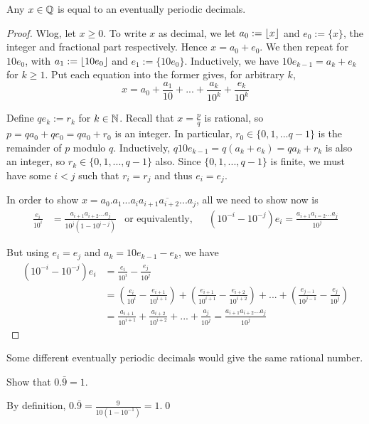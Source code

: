 \documentclass[11pt]{article}
\begin{document}
\begin{theorem}
  Any \(x \in \mathbb{Q}\) is equal to an eventually periodic decimals.
\end{theorem}
\begin{proof}
  Wlog, let \(x\geq 0\). To write \(x\) as decimal, we let \(a_0:=\left \lfloor x \right \rfloor\) and \(e_0:=\{x\}\), the integer and fractional part respectively. Hence \(x=a_0+e_0\).
  We then repeat for \(10e_0\), with \(a_1:=\left \lfloor 10e_0 \right \rfloor\) and \(e_1:=\{10e_0\}\).
  Inductively, we have \(10e_{k-1}=a_k+e_k\) for \(k\geq 1\).
  Put each equation into the former gives, for arbitrary \(k\), 
  \[x=a_0+\frac{a_1}{10}+...+\frac{a_k}{10^k}+\frac{e_k}{10^k}\]
  
  Define \(qe_k:=r_k\) for \(k\in\mathbb{N}\). Recall that \(x=\frac{p}{q}\) is rational, so \(p=qa_0+qe_0=qa_0+r_0\) is an integer. In particular, \(r_0 \in \{0,1,...q-1\}\) is the remainder of \(p\) modulo \(q\). Inductively, \(q10e_{k-1}=q(a_k+e_k)=qa_k+r_k\) is also an integer, so \(r_k \in \{0,1,...,q-1\}\) also. Since \(\{0,1,...,q-1\}\) is finite, we must have some \(i<j\) such that \(r_i=r_j\) and thus \(e_i=e_j\).

  \vspace{5pt}In order to show \(x=a_0.a_1...a_i\overline{a_{i+1}a_{i+2}...a_j}\), all we need to show now is 
  \begin{align*}
    \frac{e_i}{10^i} &= \frac{a_{i+1}a_{i+2}...a_j}{10^j(1-10^{i-j})} & \text{or equivalently,} & &(10^{-i}-10^{-j})e_i=\frac{a_{i+1}a_{i=2}...a_j}{10^j}
  \end{align*}

  But using \(e_i=e_j\) and \(a_k=10e_{k-1}-e_k\), we have
  \begin{align*}
    (10^{-i}-10^{-j})e_i&=\frac{e_i}{10^i}-\frac{e_j}{10^j}\\
    &=(\frac{e_i}{10^i}-\frac{e_{i+1}}{10^{i+1}})+(\frac{e_{i+1}}{10^{i+1}}-\frac{e_{i+2}}{10^{i+2}})+...+(\frac{e_{j-1}}{10^{j-1}}-\frac{e_j}{10^j})\\
    &=\frac{a_{i+1}}{10^{i+1}}+\frac{a_{i+2}}{10^{i+2}}+...+\frac{a_j}{10^j} 
    = \frac{a_{i+1}a_{i+2}...a_j}{10^j}
  \end{align*}
\end{proof}

Some different eventually periodic decimals would give the same rational number.

\begin{example}
  Show that \(0.\bar{9}=1\).
\end{example}
\begin{solution}
  By definition, \(0.\bar{9}=\frac{9}{10(1-10^{-1})}=1\).\qed
\end{solution}
\end{document}
